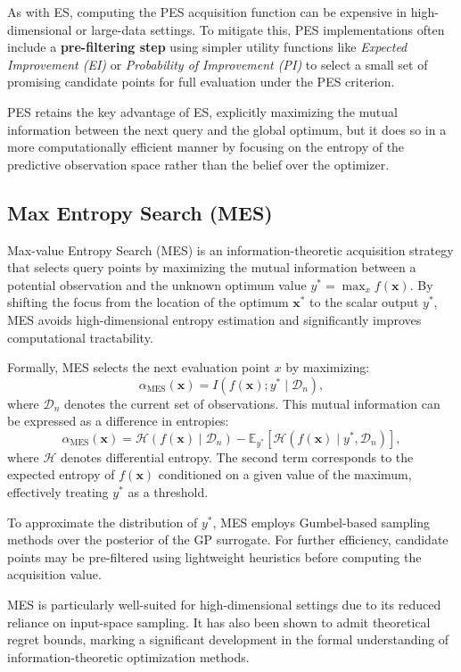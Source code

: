 \documentclass{ut-thesis}
\begin{document}
As with ES, computing the PES acquisition function can be expensive in high-dimensional or large-data settings. To mitigate this, PES implementations often include a \textbf{pre-filtering step} using simpler utility functions like \emph{Expected Improvement (EI)} or \emph{Probability of Improvement (PI)} to select a small set of promising candidate points for full evaluation under the PES criterion.

PES retains the key advantage of ES, explicitly maximizing the mutual information between the next query and the global optimum, but it does so in a more computationally efficient manner by focusing on the entropy of the predictive observation space rather than the belief over the optimizer.


\subsection{Max Entropy Search (MES)}

Max-value Entropy Search (MES) is an information-theoretic acquisition strategy that selects query points by maximizing the mutual information between a potential observation and the unknown optimum value \( y^* = \max_{x} f(\mathbf{x}) \). By shifting the focus from the location of the optimum \( \mathbf{x}^* \) to the scalar output \( y^* \), MES avoids high-dimensional entropy estimation and significantly improves computational tractability.

Formally, MES selects the next evaluation point \( x \) by maximizing:
\[
\alpha_{\text{MES}}(\mathbf{\mathbf{x}}) = I(f(\mathbf{x}); y^* \mid \mathcal{D}_n),
\]
where \( \mathcal{D}_n \) denotes the current set of observations. This mutual information can be expressed as a difference in entropies:
\[
\alpha_{\text{MES}}(\mathbf{x}) = \mathcal{H}(f(\mathbf{x}) \mid \mathcal{D}_n) - \mathbb{E}_{y^*}[\mathcal{H}(f(\mathbf{x}) \mid y^*, \mathcal{D}_n)],
\]
where \( \mathcal{H} \) denotes differential entropy. The second term corresponds to the expected entropy of \( f(\mathbf{x}) \) conditioned on a given value of the maximum, effectively treating \( y^* \) as a threshold.

To approximate the distribution of \( y^* \), MES employs Gumbel-based sampling methods over the posterior of the GP surrogate. For further efficiency, candidate points may be pre-filtered using lightweight heuristics before computing the acquisition value.

MES is particularly well-suited for high-dimensional settings due to its reduced reliance on input-space sampling. It has also been shown to admit theoretical regret bounds, marking a significant development in the formal understanding of information-theoretic optimization methods.
\end{document}
